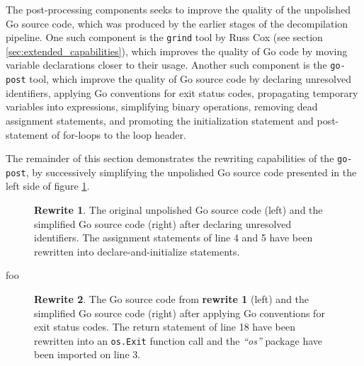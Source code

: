 The post-processing components seeks to improve the quality of the unpolished Go source code, which was produced by the earlier stages of the decompilation pipeline. One such component is the \texttt{grind} tool by Russ Cox (see section \ref{sec:extended_capabilities}), which improves the quality of Go code by moving variable declarations closer to their usage. Another such component is the \texttt{go-post} tool, which improve the quality of Go source code by declaring unresolved identifiers, applying Go conventions for exit status codes, propagating temporary variables into expressions, simplifying binary operations, removing dead assignment statements, and promoting the initialization statement and post-statement of for-loops to the loop header.

The remainder of this section demonstrates the rewriting capabilities of the \texttt{go-post}, by successively simplifying the unpolished Go source code presented in the left side of figure \ref{fig:rewrite_1}.

\begin{figure}[htbp]
	\centering
	\begin{subfigure}[t]{0.45\textwidth}
		
	\end{subfigure}
	\qquad
	\begin{subfigure}[t]{0.45\textwidth}
		
	\end{subfigure}
	\caption{\textbf{Rewrite 1}. The original unpolished Go source code (left) and the simplified Go source code (right) after declaring unresolved identifiers. The assignment statements of line 4 and 5 have been rewritten into declare-and-initialize statements.}
	\label{fig:rewrite_1}
\end{figure}

foo

\begin{figure}[htbp]
	\centering
	\begin{subfigure}[t]{0.45\textwidth}
		
	\end{subfigure}
	\qquad
	\begin{subfigure}[t]{0.45\textwidth}
		
	\end{subfigure}
	\caption{\textbf{Rewrite 2}. The Go source code from \textbf{rewrite 1} (left) and the simplified Go source code (right) after applying Go conventions for exit status codes. The return statement of line 18 have been rewritten into an \texttt{os.Exit} function call and the \textit{``os''} package have been imported on line 3.}
	\label{fig:rewrite_2}
\end{figure}

